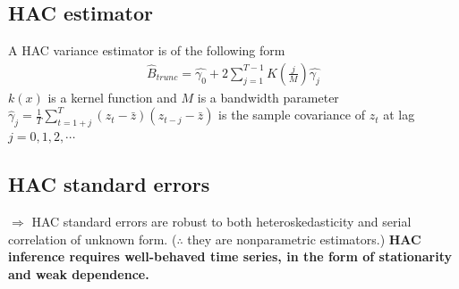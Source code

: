 \documentclass[a4paper,twoside,11pt]{article}
\begin{document}
\subsection{HAC estimator}
\begin{shaded*}
\noindent A HAC variance estimator is of the following form 
\begin{equation*}
\begin{aligned}
\hat{B}_{trunc} = \hat{\gamma_0} + 2 \sum^{T-1}_{j=1} K(\frac{j}{M})\hat{\gamma_j}
\end{aligned}
\end{equation*}
$k(x)$ is a kernel function and $M$ is a bandwidth parameter
\newline
$\hat \gamma_j = \frac{1}{T}  \sum^T_{t=1+j}(z_t - \bar z)(z_{t-j} - \bar z) $  is the sample covariance of $z_t$  at lag $j=0,1,2,\cdots$
\end{shaded*}
\subsection{HAC standard errors}
\begin{center}
\end{center}
$\Rightarrow$ HAC standard errors are robust to both heteroskedasticity and serial correlation of unknown form. ($\therefore$ they are nonparametric estimators.)
\newline
\textbf{HAC inference requires well-behaved time series, in the form of stationarity and weak dependence.}
\end{document}
